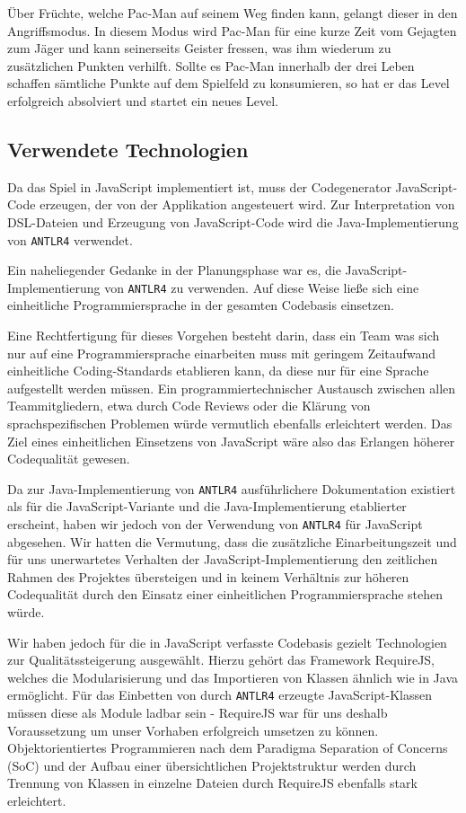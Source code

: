 \documentclass[conference]{IEEEtran}
\begin{document}
Über Früchte, welche Pac-Man auf seinem Weg finden kann, gelangt dieser in den Angriffsmodus. In diesem Modus wird Pac-Man für eine kurze Zeit vom Gejagten zum Jäger und kann seinerseits Geister fressen, was ihm wiederum zu zusätzlichen Punkten verhilft. Sollte es Pac-Man innerhalb der drei Leben schaffen sämtliche Punkte auf dem Spielfeld zu konsumieren, so hat er das Level erfolgreich absolviert und startet ein neues Level.



\subsection{Verwendete Technologien}
Da das Spiel in JavaScript implementiert ist, muss der Codegenerator JavaScript-Code erzeugen, der von der Applikation angesteuert wird. Zur Interpretation von DSL-Dateien und Erzeugung von JavaScript-Code wird die Java-Implementierung von \texttt{ANTLR4} verwendet.

Ein naheliegender Gedanke in der Planungsphase war es, die JavaScript-Implementierung von \texttt{ANTLR4} zu verwenden. Auf diese Weise ließe sich eine einheitliche Programmiersprache in der gesamten Codebasis  einsetzen.

Eine Rechtfertigung für dieses Vorgehen besteht darin, dass ein Team was sich nur auf eine Programmiersprache einarbeiten muss mit geringem Zeitaufwand einheitliche Coding-Standards etablieren kann, da diese nur für eine Sprache aufgestellt werden müssen.  Ein programmiertechnischer Austausch zwischen allen Teammitgliedern,  etwa durch Code Reviews oder die Klärung von sprachspezifischen  Problemen würde vermutlich ebenfalls erleichtert werden. Das Ziel eines einheitlichen Einsetzens von JavaScript wäre also das Erlangen höherer Codequalität gewesen.

Da zur Java-Implementierung von \texttt{ANTLR4} ausführlichere Dokumentation existiert als für die JavaScript-Variante und die Java-Implementierung etablierter erscheint, haben wir jedoch von der Verwendung von \texttt{ANTLR4} für JavaScript abgesehen. Wir hatten die Vermutung, dass die zusätzliche Einarbeitungszeit und für uns unerwartetes Verhalten der JavaScript-Implementierung den zeitlichen Rahmen des Projektes übersteigen und in keinem Verhältnis zur  höheren Codequalität durch den Einsatz einer einheitlichen Programmiersprache stehen würde.

Wir haben jedoch für die in JavaScript verfasste Codebasis gezielt Technologien zur Qualitätssteigerung ausgewählt. Hierzu gehört das Framework RequireJS, welches die Modularisierung und das Importieren von Klassen ähnlich wie in Java ermöglicht. Für das Einbetten von durch \texttt{ANTLR4} erzeugte JavaScript-Klassen müssen diese als Module ladbar sein - RequireJS war für uns deshalb Voraussetzung um unser  Vorhaben erfolgreich umsetzen zu können. Objektorientiertes Programmieren nach dem Paradigma Separation of Concerns (SoC) und der Aufbau einer übersichtlichen Projektstruktur werden durch Trennung von Klassen in einzelne Dateien durch RequireJS ebenfalls stark erleichtert.
\end{document}
